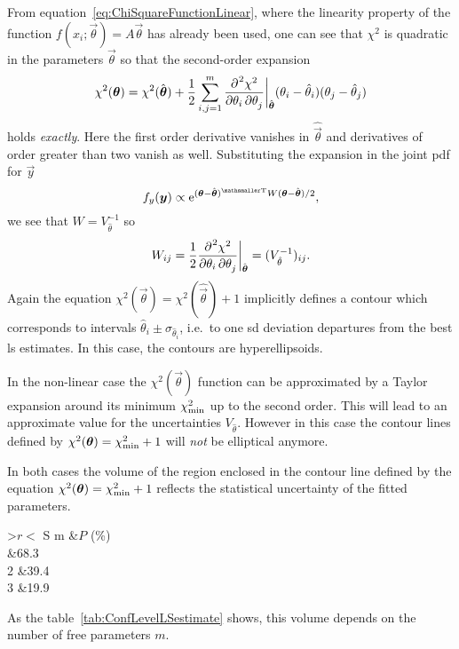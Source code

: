 \documentclass[
	10pt,
	draft
]{scrreprt}
\newcommand{\transpose}[1]{\ensuremath{#1}^{\mathrm{ \mathsmaller T}}}
\newcommand{\eu}{\ensuremath{\mathrm{e}}}
\newcommand{\pderiv}[3][]{\dfrac{{\de^{#1}}#2}{\de #3^{#1}}}%
\begin{document}
From equation~\eqref{eq:ChiSquareFunctionLinear}, where the linearity property of the function $f(x_i;\vec{\theta}) = A \vec{\theta}$ has already been used, one can see that $\chi^2$ is quadratic in the parameters $\vec{\theta}$ so that the second-order expansion
\begin{equation}
\chi^2(\vec{\theta}) = 
\chi^2(\hat{\vec{\theta}}) + \frac{1}{2}\sum_{i,j=1}^m \pderiv{^2\chi^2}{\theta_i\de\theta_j}\bigg\rvert_{\hat{\vec{\theta}}} (\theta_i - \hat\theta_i) (\theta_j - \hat\theta_j)
\end{equation}
holds \emph{exactly}.
Here the first order derivative vanishes in $\hat{\vec{\theta}}$ and derivatives of order greater than two vanish as well.
Substituting the expansion in the joint \ac{pdf} for $\vec{y}$
\begin{equation}
f_y(\vec{y}) \propto \eu^{\transpose{(\vec{\theta} - \hat{\vec{\theta}})} W (\vec{\theta} - \hat{\vec{\theta}})/2},
\end{equation}
we see that $W = V_{\hat\theta}^{-1}$ so
\begin{equation}
W_{ij} =  \frac{1}{2}\pderiv{^2\chi^2}{\theta_i\de\theta_j}\bigg\rvert_{\hat{\vec{\theta}}} = (V_{\hat\theta}^{-1})_{ij}.
\end{equation}
Again the equation $\chi^2(\vec{\theta}) = \chi^2(\hat{\vec{\theta}}) + 1$ implicitly defines a contour which corresponds to intervals $\hat\theta_i \pm \sigma_{\hat{\theta}_i}$, i.e.~to one \ac{sd} deviation departures from the best \ac{ls} estimates.
In this case, the contours are hyperellipsoids.



In the non-linear case the $\chi^2(\vec{\theta})$ function can be approximated by a Taylor expansion around its minimum $\chi^2_\textup{min}$ up to the second order.
This will lead to an approximate value for the uncertainties $V_{\hat\theta}$.
However in this case the contour lines defined by $\chi^2(\vec{\theta}) = \chi^2_\textup{min} + 1$ will \emph{not} be elliptical anymore.


In both cases the volume of the region enclosed in the contour line defined by the equation $\chi^2(\vec{\theta}) = \chi^2_\textup{min} + 1$ reflects the statistical uncertainty of the fitted parameters.
\begin{table}
	\centering
\caption{Probabilities (i.e.~confidence levels) of the \SI{1}{\ensuremath{\sigma}} region for different numbers of parameters $m$.}
\label{tab:ConfLevelLSestimate}
\begin{tabular}{>$r<$ S}
\toprule
m &{\ensuremath{P} (\si{\percent})}\\
 	&68.3\\
2	&39.4\\
3	&19.9\\
\bottomrule
\end{tabular}
\end{table}
As the table~\ref{tab:ConfLevelLSestimate} shows, this volume depends on the number of free parameters $m$.
\end{document}

